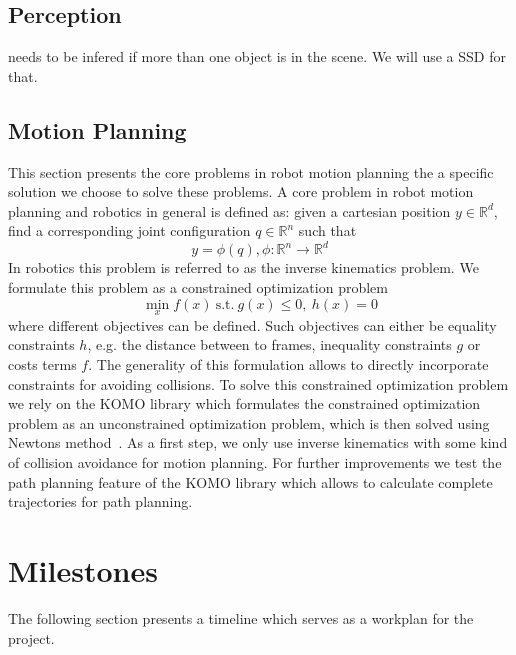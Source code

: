 \documentclass[a4paper]{article}
\begin{document}
\subsection{Perception}
\label{3_1subsec_perception}
needs to be infered if more than one object is in the scene. We will use a 
SSD for that.
\subsection{Motion Planning}
\label{3_2subsec_motion_planning}
This section presents the core problems in robot motion planning the a specific solution we choose to solve these problems.
A core problem in robot motion planning and robotics in general is defined as: given a cartesian position $y \in \mathbb{R}^d$, find a corresponding joint configuration $q \in \mathbb{R}^n$ such that
\begin{equation}
    y = \phi(q),  \phi : \mathbb{R}^n \rightarrow \mathbb{R}^d
\end{equation}
In robotics this problem is referred to as the inverse kinematics problem.
We formulate this problem as a constrained optimization problem 
\begin{equation}
    \min_x f(x) \ \text{s.t.} \ g(x) \leq 0, \  h(x) = 0
\end{equation}
where different objectives can be defined. 
Such objectives can either be equality constraints $h$, e.g. the distance between to frames, inequality constraints $g$ or costs terms $f$.
The generality of this formulation allows to directly incorporate constraints for avoiding collisions.
To solve this constrained optimization problem we rely on the KOMO library which formulates the constrained optimization problem as an unconstrained optimization problem, which is then solved using Newtons method~\cite{laumond_tutorial_2017}.
As a first step, we only use inverse kinematics with some kind of collision avoidance for motion planning. 
For further improvements we test the path planning feature of the KOMO library which allows to calculate complete trajectories for path planning.
\clearpage
\section{Milestones}
\label{4_sec_milestones}

The following section presents a timeline which serves as a workplan for the project.
\end{document}
